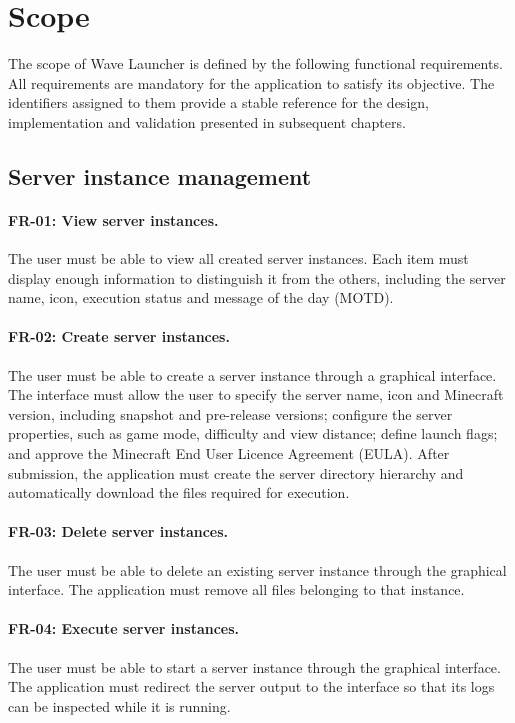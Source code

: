\section{Scope}\label{sec:scope}

The scope of Wave Launcher is defined by the following functional requirements. All requirements are mandatory for the application to satisfy its objective. The identifiers assigned to them provide a stable reference for the design, implementation and validation presented in subsequent chapters.

\subsection{Server instance management}

\paragraph{FR-01: View server instances.} The user must be able to view all created server instances. Each item must display enough information to distinguish it from the others, including the server name, icon, execution status and message of the day (\acs{MOTD}).

\paragraph{FR-02: Create server instances.} The user must be able to create a server instance through a graphical interface. The interface must allow the user to specify the server name, icon and Minecraft version, including snapshot and pre-release versions; configure the server properties, such as game mode, difficulty and view distance; define launch flags; and approve the Minecraft End User Licence Agreement (\acs{EULA}). After submission, the application must create the server directory hierarchy and automatically download the files required for execution.

\paragraph{FR-03: Delete server instances.} The user must be able to delete an existing server instance through the graphical interface. The application must remove all files belonging to that instance.

\paragraph{FR-04: Execute server instances.} The user must be able to start a server instance through the graphical interface. The application must redirect the server output to the interface so that its logs can be inspected while it is running.

